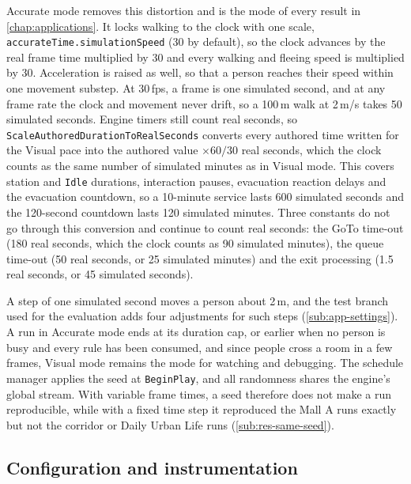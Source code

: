 Accurate mode removes this distortion and is the mode of every result in \cref{chap:applications}. It locks walking to the clock with one scale, \texttt{accurateTime.simulationSpeed} (30 by default), so the clock advances by the real frame time multiplied by 30 and every walking and fleeing speed is multiplied by 30. Acceleration is raised as well, so that a person reaches their speed within one movement substep. At 30\,fps, a frame is one simulated second, and at any frame rate the clock and movement never drift, so a 100\,m walk at 2\,m/s takes 50 simulated seconds. Engine timers still count real seconds, so \texttt{ScaleAuthoredDurationToRealSeconds} converts every authored time written for the Visual pace into the authored value $\times 60/30$ real seconds, which the clock counts as the same number of simulated minutes as in Visual mode. This covers station and \texttt{Idle} durations, interaction pauses, evacuation reaction delays and the evacuation countdown, so a 10-minute service lasts 600 simulated seconds and the 120-second countdown lasts 120 simulated minutes. Three constants do not go through this conversion and continue to count real seconds: the GoTo time-out (180 real seconds, which the clock counts as 90 simulated minutes), the queue time-out (50 real seconds, or 25 simulated minutes) and the exit processing (1.5 real seconds, or 45 simulated seconds).

A step of one simulated second moves a person about 2\,m, and the test branch used for the evaluation adds four adjustments for such steps (\cref{sub:app-settings}). A run in Accurate mode ends at its duration cap, or earlier when no person is busy and every rule has been consumed, and since people cross a room in a few frames, Visual mode remains the mode for watching and debugging. The schedule manager applies the seed at \texttt{BeginPlay}, and all randomness shares the engine's global stream. With variable frame times, a seed therefore does not make a run reproducible, while with a fixed time step it reproduced the Mall A runs exactly but not the corridor or Daily Urban Life runs (\cref{sub:res-same-seed}).

\subsection{Configuration and instrumentation}
\label{sec:config-file}\label{sec:instrumentation}

